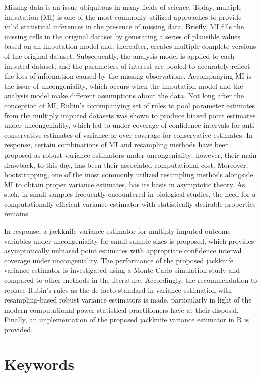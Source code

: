 \documentclass[
  letterpaper,
  DIV=11,
  numbers=noendperiod]{scrreprt}
\begin{document}
Missing data is an issue ubiquitous in many fields of science. Today,
multiple imputation (MI) is one of the most commonly utilized approaches
to provide valid statistical inferences in the presence of missing data.
Briefly, MI fills the missing cells in the original dataset by
generating a series of plausible values based on an imputation model
and, thereafter, creates multiple complete versions of the original
dataset. Subsequently, the analysis model is applied to each imputed
dataset, and the parameters of interest are pooled to accurately reflect
the loss of information caused by the missing observations. Accompanying
MI is the issue of uncongeniality, which occurs when the imputation
model and the analysis model make different assumptions about the data.
Not long after the conception of MI, Rubin's accompanying set of rules
to pool parameter estimates from the multiply imputed datasets was shown
to produce biased point estimates under uncongeniality, which led to
under-coverage of confidence intervals for anti-conservative estimates
of variance or over-coverage for conservative estimates. In response,
certain combinations of MI and resampling methods have been proposed as
robust variance estimators under uncongeniality; however, their main
drawback, to this day, has been their associated computational cost.
Moreover, bootstrapping, one of the most commonly utilized resampling
methods alongside MI to obtain proper variance estimates, has its basis
in asymptotic theory. As such, in small samples frequently encountered
in biological studies, the need for a computationally efficient variance
estimator with statistically desirable properties remains.

In response, a jackknife variance estimator for multiply imputed outcome
variables under uncongeniality for small sample sizes is proposed, which
provides asymptotically unbiased point estimates with appropriate
confidence interval coverage under uncongeniality. The performance of
the proposed jackknife variance estimator is investigated using a Monte
Carlo simulation study and compared to other methods in the literature.
Accordingly, the recommendation to replace Rubin's rules as the de facto
standard in variance estimation with resampling-based robust variance
estimators is made, particularly in light of the modern computational
power statistical practitioners have at their disposal. Finally, an
implementation of the proposed jackknife variance estimator in R is
provided.

\hypertarget{keywords}{%
\section{Keywords}\label{keywords}}
\end{document}
